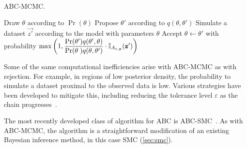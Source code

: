 \begin{algorithm}
  \caption{ABC-MCMC.}
  \begin{algorithmic}
    \State Draw $\theta$ according to $\Pr(\theta)$
    \Loop
      \State Propose $\theta'$ according to $q(\theta, \theta')$
      \State Simulate a dataset $\vec{z'}$ according to the model with
             parameters $\theta$
      \State Accept $\theta \gets \theta'$ with probability
      $\max \left( 1, 
       \dfrac{\Pr(\theta') q(\theta', \theta)}
             {\Pr(\theta\phantom{'}) q(\theta, \theta')} 
       \cdot \mathbb{I}_{A_{\varepsilon, \mathbf{y}}}(\mathbf{z'}) \right)$
    \EndLoop
  \end{algorithmic}
  \label{alg:abcmcmc}
\end{algorithm}

Some of the same computational inefficiencies arise with \gls{ABC}-\gls{MCMC}
as with rejection. For example, in regions of low posterior density, the
probability to simulate a dataset proximal to the observed data is low. Various
strategies have been developed to mitigate this, including reducing the
tolerance level $\varepsilon$ as the chain
progresses~\autocite{ratmann2007using}.

The most recently developed class of algorithm for \gls{ABC} is
\gls{ABC}-\gls{SMC}~\autocite{sisson2007sequential, 2009adaptive}. As with
\gls{ABC}-\gls{MCMC}, the algorithm is a straightforward modification of an
existing Bayesian inference method, in this case \gls{SMC} (\cref{sec:smc}).


